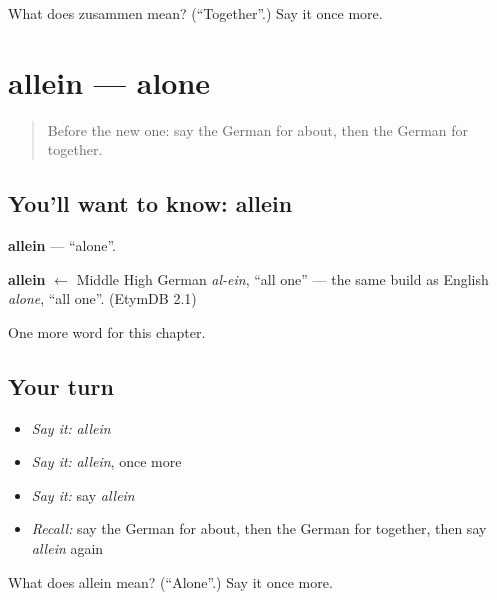 \begin{tcolorbox}[breakable,colback=teal!4,colframe=teal!35!black,title={Before you move on}]
What does zusammen mean? (\textquotedblleft{}Together\textquotedblright{}.) Say it once more.
\end{tcolorbox}
\section[allein]{allein — alone}

\label{lesson:GE-C173-allein}



\begin{quote}
Before the new one: say the German for about, then the German for together.
\end{quote}

\subsection*{You'll want to know: allein}
\textbf{allein} — \textquotedblleft{}alone\textquotedblright{}.

\begin{cousinweb}
\textbf{allein} $\leftarrow$ Middle High German \emph{al-ein}, \textquotedblleft{}all one\textquotedblright{} — the same build as English \emph{alone}, \textquotedblleft{}all one\textquotedblright{}. (EtymDB 2.1)
\end{cousinweb}

\begin{grammarlens}[title={What you've built}]
One more word for this chapter.
\end{grammarlens}

\subsection*{Your turn}
\begin{itemize}
\raggedright
  \item \emph{Say it:} \emph{allein}
  \item \emph{Say it:} \emph{allein}, once more
  \item \emph{Say it:} say \emph{allein}
  \item \emph{Recall:} say the German for about, then the German for together, then say \emph{allein} again
\end{itemize}

\begin{tcolorbox}[breakable,colback=teal!4,colframe=teal!35!black,title={Before you move on}]
What does allein mean? (\textquotedblleft{}Alone\textquotedblright{}.) Say it once more.
\end{tcolorbox}
